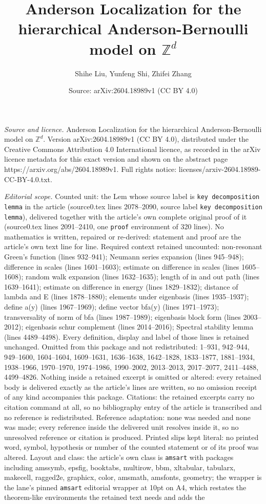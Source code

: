\documentclass[10pt,a4paper]{amsart}
\title[Anderson Localization for the hierarchical Anderson-Bernoull]{Anderson Localization for the hierarchical Anderson-Bernoulli model on $\mathbb{Z}^d$}
\author{Shihe Liu, Yunfeng Shi, Zhifei Zhang}
\date{Source: arXiv:2604.18989v1 (CC BY 4.0)}
\begin{document}
\maketitle

\noindent\emph{Source and licence.} Anderson Localization for the hierarchical Anderson-Bernoulli model on $\mathbb{Z}^d$. Version arXiv:2604.18989v1 (CC BY 4.0), distributed under the Creative Commons Attribution 4.0 International licence, as recorded in the arXiv licence metadata for this exact version and shown on the abstract page https://arxiv.org/abs/2604.18989v1. Full rights notice: licenses/arxiv-2604.18989-CC-BY-4.0.txt.\par\smallskip

\noindent\textit{Editorial scope.} Counted unit: the Lem whose source label is \texttt{key decomposition lemma} in the article (source0.tex lines 2078--2090, source label \texttt{key decomposition lemma}), delivered together with the article's own complete original proof of it (source0.tex lines 2091--2410, one \texttt{proof} environment of 320 lines). No mathematics is written, repaired or re-derived: statement and proof are the article's own text line for line. Required context retained uncounted: non-resonant Green's function (lines 932--941); Neumann series expansion (lines 945--948); difference in scales (lines 1601--1603); estimate on difference in scales (lines 1605--1608); random walk expansion (lines 1632--1635); length of in and out path (lines 1639--1641); estimate on difference in energy (lines 1829--1832); distance of lambda and E (lines 1878--1880); elements under eigenbasis (lines 1935--1937); define a(y) (lines 1967--1969); define vector bfa(y) (lines 1971--1973); transversality of norm of bfa (lines 1987--1989); eigenbasis block form (lines 2003--2012); eigenbasis schur complement (lines 2014--2016); Spectral stability lemma (lines 4489--4498). Every definition, display and label of those lines is retained unchanged. Omitted from this package and not redistributed: 1--931, 942--944, 949--1600, 1604--1604, 1609--1631, 1636--1638, 1642--1828, 1833--1877, 1881--1934, 1938--1966, 1970--1970, 1974--1986, 1990--2002, 2013--2013, 2017--2077, 2411--4488, 4499--4826. Nothing inside a retained excerpt is omitted or altered: every retained body is delivered exactly as the article's lines are written, so no omission receipt of any kind accompanies this package. Citations: the retained excerpts carry no citation command at all, so no bibliography entry of the article is transcribed and no reference is redistributed. Reference adaptation: none was needed and none was made; every reference inside the delivered unit resolves inside it, so no unresolved reference or citation is produced. Printed slips kept literal: no printed word, symbol, hypothesis or number of the counted statement or of its proof was altered. Layout and class: the article's own class is \texttt{amsart} with packages including amssymb, epsfig, booktabs, multirow, bbm, xltabular, tabularx, makecell, ragged2e, graphicx, color, amsmath, amsfonts, geometry; the wrapper is the lane's pinned \texttt{amsart} editorial wrapper at 10pt on A4, which restates the theorem-like environments the retained text needs and adds the 
\end{document}
